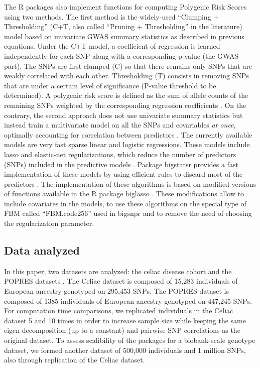 \documentclass{bioinfo}
\begin{document}
\begin{methods}
The R packages also implement functions for computing Polygenic Risk Scores using two methods. 
{\color{red} The first method is the widely-used ``Clumping + Thresholding'' (C+T, also called ``Pruning + Thresholding'' in the literature) model based on univariate GWAS summary statistics as described in previous equations.}
Under the C+T model, a coefficient of regression is learned independently for each SNP along with a corresponding p-value (the GWAS part). The SNPs are first clumped (C) so that there remains only SNPs that are weakly correlated with each other. Thresholding (T) consists in removing SNPs that are under a certain level of significance (P-value threshold to be determined). A polygenic risk score is defined as the sum of allele counts of the remaining SNPs weighted by the corresponding regression coefficients \cite[]{Chatterjee2013,Dudbridge2013,Euesden2015}. 
On the contrary, the second approach does not use univariate summary statistics but instead train a multivariate model on all the SNPs and covariables \textit{at once}, optimally accounting for correlation between predictors \cite[]{Abraham2012}. The currently available models are very fast sparse linear and logistic regressions. These models include lasso and elastic-net regularizations, which reduce the number of  predictors (SNPs) included in the predictive models \cite[]{Friedman2010,Tibshirani1996,Zou2005}. Package bigstatsr provides a fast implementation of these models by using efficient rules to discard most of the predictors \cite[]{Tibshirani2012}. The implementation of these algorithms is based on modified versions of functions available in the R package biglasso \cite[]{Zeng2017}. These modifications allow to include covariates in the models, to use these algorithms on the special type of FBM called ``FBM.code256'' used in bigsnpr and to remove the need of choosing the regularization parameter.

\subsection{Data analyzed}

In this paper, two datasets are analyzed: the celiac disease cohort and the POPRES datasets \cite[]{Dubois2010,Nelson2008}. The Celiac dataset is composed of 15,283 individuals of European ancestry genotyped on 295,453 SNPs. The POPRES dataset is composed of 1385 individuals of European ancestry genotyped on 447,245 SNPs.
For computation time comparisons, we replicated individuals in the Celiac dataset 5 and 10 times in order to increase sample size while keeping the same {\color{red} eigen decomposition (up to a constant) and pairwise SNP correlations} as the original dataset. To assess scalibility of the packages for a biobank-scale genotype dataset, we formed another dataset of 500,000 individuals and 1 million SNPs, also through replication of the Celiac dataset. \label{sec:rep}


\end{methods}
\end{document}
